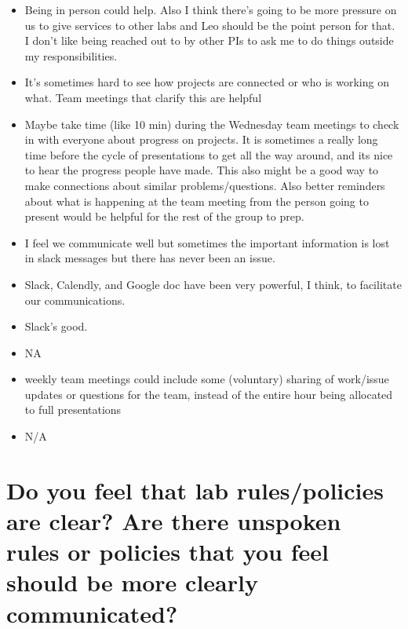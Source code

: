 \documentclass[
]{book}
\providecommand{\tightlist}{%
  \setlength{\itemsep}{0pt}\setlength{\parskip}{0pt}}
\begin{document}
\begin{itemize}
\tightlist
\item
  Being in person could help. Also I think there's going to be more pressure on us to give services to other labs and Leo should be the point person for that. I don't like being reached out to by other PIs to ask me to do things outside my responsibilities.
\item
  It's sometimes hard to see how projects are connected or who is working on what. Team meetings that clarify this are helpful
\item
  Maybe take time (like 10 min) during the Wednesday team meetings to check in with everyone about progress on projects. It is sometimes a really long time before the cycle of presentations to get all the way around, and its nice to hear the progress people have made. This also might be a good way to make connections about similar problems/questions. Also better reminders about what is happening at the team meeting from the person going to present would be helpful for the rest of the group to prep.\\
\item
  I feel we communicate well but sometimes the important information is lost in slack messages but there has never been an issue.
\item
  Slack, Calendly, and Google doc have been very powerful, I think, to facilitate our communications.
\item
  Slack's good.
\item
  NA
\item
  weekly team meetings could include some (voluntary) sharing of work/issue updates or questions for the team, instead of the entire hour being allocated to full presentations
\item
  N/A
\end{itemize}

\hypertarget{do-you-feel-that-lab-rulespolicies-are-clear-are-there-unspoken-rules-or-policies-that-you-feel-should-be-more-clearly-communicated}{%
\section{Do you feel that lab rules/policies are clear? Are there unspoken rules or policies that you feel should be more clearly communicated?}\label{do-you-feel-that-lab-rulespolicies-are-clear-are-there-unspoken-rules-or-policies-that-you-feel-should-be-more-clearly-communicated}}
\end{document}
